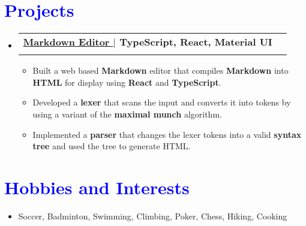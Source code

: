 \documentclass[letterpaper,11pt]{article}
\makeatletter
\newcommand{\resumeItem}[1]{
  \item\small{
    {#1 \vspace{-2pt}}
  }
}
\newcommand{\resumeSubheading}[4]{
  \vspace{-2pt}\item
    \begin{tabular*}{1.0\textwidth}[t]{l@{\extracolsep{\fill}}r}
      \textbf{#1} & \textbf{\small #2} \\
      \textit{\small#3} & \textit{\small #4} \\
    \end{tabular*}\vspace{-7pt}
}
\newcommand{\resumeSubHeadingListStart}{\begin{itemize}[leftmargin=0.0in, label={}]}
\newcommand{\resumeSubHeadingListEnd}{\end{itemize}}
\newcommand{\resumeItemListStart}{\begin{itemize}[leftmargin=0.2in]}
\newcommand{\resumeItemListEnd}{\end{itemize}\vspace{-5pt}}
\makeatother
\begin{document}
\section{\textcolor{Blue}{Projects}}
  \resumeSubHeadingListStart


    
    \resumeSubheading
      {{\href{https://markdown.torychen.com}{\textcolor{NavyBlue}{Markdown Editor  }\faGithub}} $|$ \textnormal{TypeScript, React, Material UI}}{}
      {}{}
      \vspace{-16pt}
      \resumeItemListStart
        \resumeItem{Built a web based \textbf{Markdown} editor that compiles \textbf{Markdown} into \textbf{HTML} for display using \textbf{React} and \textbf{TypeScript}.}
        \resumeItem{Developed a \textbf{lexer} that scans the input and converts it into tokens by using a variant of the \textbf{maximal munch} algorithm.}
        \resumeItem{Implemented a \textbf{parser} that changes the lexer tokens into a valid \textbf{syntax tree} and used the tree to generate HTML.}
    \resumeItemListEnd
    
  \resumeSubHeadingListEnd
\vspace{-12pt}


\section{\textcolor{Blue}{Hobbies and Interests}}
  \resumeItemListStart
    \resumeItem{Soccer, Badminton, Swimming, Climbing, Poker, Chess, Hiking, Cooking}
  \resumeItemListEnd
\end{document}
